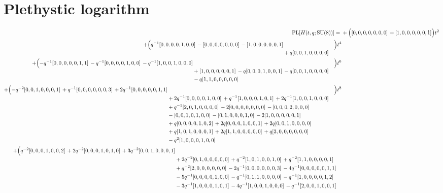 \documentclass[10pt]{article}
\begin{document}
\section{Plethystic logarithm}
\[
\begin{aligned}
\operatorname{PL}[H(t,q;\mathrm{SU}(8))] ={}&
  + \Bigl([0,0,0,0,0,0,0]\,+[1,0,0,0,0,0,1]\Bigr)t^{2} \\
  + \Bigl(\begin{aligned}[t]q^{-1}[0,0,0,0,1,0,0]\,-[0,0,0,0,0,0,0]\,-[1,0,0,0,0,0,1] \\
  &{}+q[0,0,1,0,0,0,0]\end{aligned}\Bigr)t^{4} \\
  + \Bigl(\begin{aligned}[t]-q^{-1}[0,0,0,0,0,1,1]\,-q^{-1}[0,0,0,0,1,0,0]\,-q^{-1}[1,0,0,1,0,0,0] \\
  &{}+[1,0,0,0,0,0,1]\,-q[0,0,0,1,0,0,1]\,-q[0,0,1,0,0,0,0] \\
  &{}-q[1,1,0,0,0,0,0]\end{aligned}\Bigr)t^{6} \\
  + \Bigl(\begin{aligned}[t]-q^{-2}[0,0,1,0,0,0,1]\,+q^{-1}[0,0,0,0,0,0,3]\,+2q^{-1}[0,0,0,0,0,1,1] \\
  &{}+2q^{-1}[0,0,0,0,1,0,0]\,+q^{-1}[1,0,0,0,1,0,1]\,+2q^{-1}[1,0,0,1,0,0,0] \\
  &{}+q^{-1}[2,0,1,0,0,0,0]\,-2[0,0,0,0,0,0,0]\,-[0,0,0,2,0,0,0] \\
  &{}-[0,0,1,0,1,0,0]\,-[0,1,0,0,0,1,0]\,-2[1,0,0,0,0,0,1] \\
  &{}+q[0,0,0,0,1,0,2]\,+2q[0,0,0,1,0,0,1]\,+2q[0,0,1,0,0,0,0] \\
  &{}+q[1,0,1,0,0,0,1]\,+2q[1,1,0,0,0,0,0]\,+q[3,0,0,0,0,0,0] \\
  &{}-q^{2}[1,0,0,0,1,0,0]\end{aligned}\Bigr)t^{8} \\
  + \Bigl(\begin{aligned}[t]q^{-2}[0,0,0,1,0,0,2]\,+2q^{-2}[0,0,0,1,0,1,0]\,+3q^{-2}[0,0,1,0,0,0,1] \\
  &{}+2q^{-2}[0,1,0,0,0,0,0]\,+q^{-2}[1,0,1,0,0,1,0]\,+q^{-2}[1,1,0,0,0,0,1] \\
  &{}+q^{-2}[2,0,0,0,0,0,0]\,-2q^{-1}[0,0,0,0,0,0,3]\,-4q^{-1}[0,0,0,0,0,1,1] \\
  &{}-5q^{-1}[0,0,0,0,1,0,0]\,-q^{-1}[0,1,1,0,0,0,0]\,-q^{-1}[1,0,0,0,0,1,2] \\
  &{}-3q^{-1}[1,0,0,0,1,0,1]\,-4q^{-1}[1,0,0,1,0,0,0]\,-q^{-1}[2,0,0,1,0,0,1] \\

\end{aligned}
\end{aligned}\]
\end{document}
